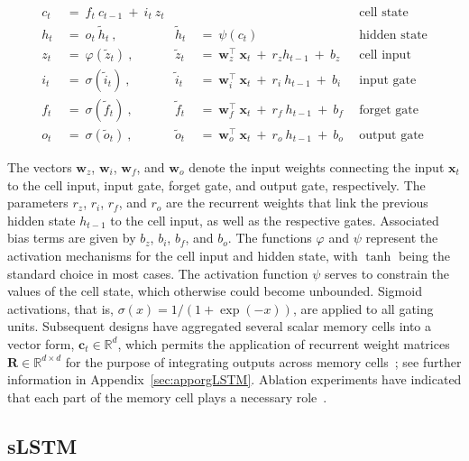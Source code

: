 \begin{align}
c_t \ &= \  f_t \ c_{t-1} \ + \ i_t \ z_t &  & &\text{cell state} \\
h_t  \ &= \ o_t \ \tilde{h}_t \ , & \tilde{h}_t \ &= \ \psi \left( c_t\right)
  &\text{hidden state} \\
z_t \ &= \ \varphi \left( \tilde{z}_t \right) \ , 
  &\tilde{z}_t \ &=  \ \mathbf{w}^\top_{z} \ \mathbf{x}_t \ + \
  r_{z}  h_{t-1} \ + \  b_{z} \ \
  &\text{cell input} \\
i_t \ &= \ \sigma \left( \tilde{i}_t  \right) \ , 
  &\tilde{i}_t \ &= \ \mathbf{w}^\top_{i} \ \mathbf{x}_t \ + \
  r_{i}  \ h_{t-1} \ + \  b_{i} \ \
  &\text{input gate} \\
f_t \ &= \ \sigma \left(  \tilde{f}_t \right) \ , 
  &\tilde{f}_t \ &= \ \mathbf{w}^\top_{f} \ \mathbf{x}_t  \ + \
  r_{f}  \ h_{t-1} \ + \  b_{f} \ \
  &\text{forget gate} \\
o_t \ &= \ \sigma \left( \tilde{o}_t \right) \ , 
  &\tilde{o}_t  \ &= \ \mathbf{w}^\top_{o} \ \mathbf{x}_t \ + \
  r_{o}  \ h_{t-1} \ + \  b_{o} \ \
  &\text{output gate} 
\end{align}

The vectors $\mathbf{w}_{z}$, $\mathbf{w}_{i}$, $\mathbf{w}_{f}$, and $\mathbf{w}_{o}$ denote the input weights connecting the input $\mathbf{x}_t$ to the cell input, input gate, forget gate, and output gate, respectively. The parameters $r_{z}$, $r_{i}$, $r_{f}$, and $r_{o}$ are the recurrent weights that link the previous hidden state $h_{t-1}$ to the cell input, as well as the respective gates. Associated bias terms are given by $b_{z}$, $b_{i}$, $b_{f}$, and $b_{o}$. The functions $\varphi$ and $\psi$ represent the activation mechanisms for the cell input and hidden state, with $\tanh$ being the standard choice in most cases. The activation function $\psi$ serves to constrain the values of the cell state, which otherwise could become unbounded. Sigmoid activations, that is, $\sigma \left( x \right)= 1/(1+\exp(-x))$, are applied to all gating units. Subsequent designs have aggregated several scalar memory cells into a vector form, $\mathbf{c}_t \in \mathbb{R}^{d}$, which permits the application of recurrent weight matrices $\mathbf{R} \in \mathbb{R}^{d \times d}$ for the purpose of integrating outputs across memory cells~\citep{Greff:15}; see further information in Appendix~\ref{sec:apporgLSTM}. Ablation experiments have indicated that each part of the memory cell plays a necessary role~\citep{Greff:15}.

\subsection{sLSTM}
\label{sec:sLSTM}

